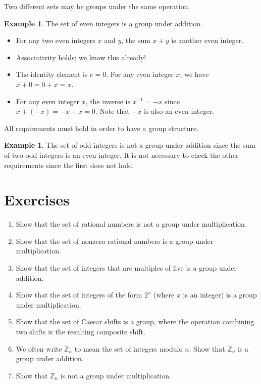 \documentclass{book}
\theoremstyle{plain}
\theoremstyle{definition}
\newtheorem{example}[theorem]{Example}
\begin{document}
Two different sets may be groups under the same operation.

\begin{example}
The set of even integers is a group under addition.
\begin{itemize}
\item For any two even integers $x$ and $y$, the sum $x+y$ is another even integer.
\item Associativity holds; we know this already!
\item The identity element is $e = 0$. For any even integer $x$, we have $x + 0 = 0 + x = x$.
\item For any even integer $x$, the inverse is $x^{-1} = -x$ since $x + (-x) = -x + x = 0$. Note that $-x$ is also an even integer.
\end{itemize}
\end{example}

All requirements must hold in order to have a group structure.

\begin{example}
The set of odd integers is not a group under addition since the sum of two odd integers is an even integer. It is not necessary to check the other requirements since the first does not hold.
\end{example}

\section{Exercises}
\begin{enumerate}
\item Show that the set of rational numbers is not a group under multiplication.
\item Show that the set of nonzero rational numbers is a group under multiplication.
\item Show that the set of integers that are multiples of five is a group under addition.
\item Show that the set of integers of the form $2^x$ (where $x$ is an integer) is a group under multiplication.
\item Show that the set of Caesar shifts is a group, where the operation combining two shifts is the resulting composite shift.
\item We often write $\mathbb{Z}_n$ to mean the set of integers modulo $n$. Show that $\mathbb{Z}_n$ is a group under addition.
\item Show that $\mathbb{Z}_n$ is not a group under multiplication.
\end{enumerate}
\end{document}
